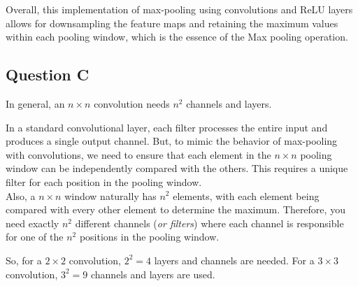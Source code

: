 Overall, this implementation of max-pooling using convolutions and ReLU layers allows for downsampling the feature maps and retaining the maximum values within each pooling window, which is the essence of the Max pooling operation.
\vspace{3mm}

\subsection{Question C}

In general, an $n \times n$ convolution needs $n^2$ channels and layers.

In a standard convolutional layer, each filter processes the entire input and produces a single output channel.
But, to mimic the behavior of max-pooling with convolutions, we need to ensure that each element in the $n \times n$ pooling window can be independently compared with the others. This requires a unique filter for each position in the pooling window.\\

Also, a $n \times n$ window naturally has $n^2$ elements, with each element being compared with every other element to determine the maximum. Therefore, you need exactly $n^2$ different channels (\textit{or filters}) where each channel is responsible for one of the $n^2$ positions in the pooling window. 

So, for a $2 \times 2$ convolution, \underline{$2^2 = 4$} layers and channels are needed.
For a $3 \times 3$ convolution, \underline{$3^2 = 9$} channels and layers are used.